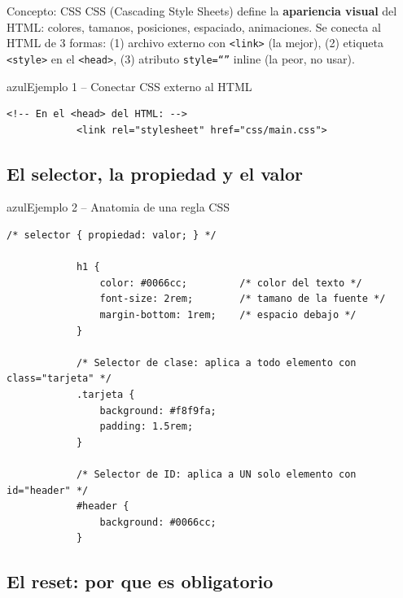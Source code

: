 \documentclass[11pt,a4paper]{article}
\begin{document}
	\begin{cajaconcepto}{Concepto: CSS}
		CSS (Cascading Style Sheets) define la \textbf{apariencia visual} del HTML: colores, tamanos, posiciones, espaciado, animaciones. Se conecta al HTML de 3 formas: (1) archivo externo con \texttt{<link>} (la mejor), (2) etiqueta \texttt{<style>} en el \texttt{<head>}, (3) atributo \texttt{style=``''} inline (la peor, no usar).
	\end{cajaconcepto}
	
	\begin{cajacodigo}{azul}{Ejemplo 1 -- Conectar CSS externo al HTML}
		\begin{lstlisting}[style=codehtml]
			<!-- En el <head> del HTML: -->
			<link rel="stylesheet" href="css/main.css">
		\end{lstlisting}
	\end{cajacodigo}
	
	\subsection{El selector, la propiedad y el valor}
	
	\begin{cajacodigo}{azul}{Ejemplo 2 -- Anatomia de una regla CSS}
		\begin{lstlisting}[style=codecss]
			/* selector { propiedad: valor; } */
			
			h1 {
				color: #0066cc;         /* color del texto */
				font-size: 2rem;        /* tamano de la fuente */
				margin-bottom: 1rem;    /* espacio debajo */
			}
			
			/* Selector de clase: aplica a todo elemento con class="tarjeta" */
			.tarjeta {
				background: #f8f9fa;
				padding: 1.5rem;
			}
			
			/* Selector de ID: aplica a UN solo elemento con id="header" */
			#header {
				background: #0066cc;
			}
		\end{lstlisting}
	\end{cajacodigo}
	
	\subsection{El reset: por que es obligatorio}
	
\end{document}

